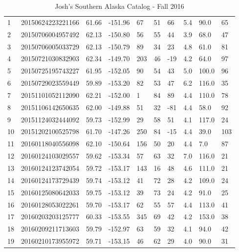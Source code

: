 \documentclass[11pt,titlepage,fleqn]{article}
\begin{document}
\clearpage\pagebreak
\begin{table}[]
\centering
\caption{Josh's Southern Alaska Catalog - Fall 2016}

\label{my-label}
\begin{tabular}{llllllllll}
\hline
1 & 20150624223221166 & 61.66 & -151.96 &  67 &  51 &  66 & 5.4 & 90.0 & 65 \\ 
2 & 20150706004957492 & 62.13 & -150.80 &  56 &  55 &  44 & 3.9 & 68.0 & 47 \\ 
3 & 20150706005033729 & 62.13 & -150.79 &  89 &  34 &  23 & 4.8 & 61.0 & 81 \\ 
4 & 20150721030832903 & 62.34 & -149.70 & 203 &  46 & -19 & 4.2 & 64.0 & 97 \\ 
5 & 20150725195743227 & 61.95 & -152.05 &  90 &  54 &  43 & 5.0 & 100.0 & 96 \\ 
6 & 20150729023559449 & 59.89 & -153.20 &  82 &  53 &  47 & 6.2 & 116.0 & 35 \\ 
7 & 20151101052112090 & 62.21 & -152.00 &   1 &  84 &  89 & 4.4 & 110.0 & 78 \\ 
8 & 20151106142650635 & 62.00 & -149.88 &  51 &  32 & -81 & 4.4 & 58.0 & 92 \\ 
9 & 20151124032444092 & 59.73 & -152.99 &  29 &  58 &  51 & 4.1 & 117.0 & 24 \\ 
10 & 20151202100525798 & 61.70 & -147.26 & 250 &  84 & -15 & 4.4 & 39.0 & 103 \\ 
11 & 20160118040556098 & 62.10 & -150.64 & 156 &  50 &  20 & 4.4 & 7.0 & 87 \\ 
12 & 20160124103029557 & 59.62 & -153.34 &  57 &  63 &  32 & 7.0 & 116.0 & 21 \\ 
13 & 20160124123742054 & 59.72 & -153.17 & 143 &  16 &  48 & 4.6 & 111.0 & 21 \\ 
14 & 20160124173729439 & 59.74 & -153.12 &  41 &  72 &  28 & 4.2 & 109.0 & 24 \\ 
15 & 20160125080642033 & 59.75 & -153.12 &  39 &  73 &  24 & 4.2 & 91.0 & 25 \\ 
16 & 20160128053022261 & 59.70 & -153.17 &  62 &  55 &  57 & 4.4 & 113.0 & 41 \\ 
17 & 20160203203125777 & 60.33 & -153.55 & 345 &  69 &  42 & 4.2 & 153.0 & 38 \\ 
18 & 20160209211713603 & 59.79 & -152.97 &  63 &  59 &  32 & 4.1 & 94.0 & 42 \\ 
19 & 20160210173955972 & 59.71 & -153.15 &  46 &  62 &  29 & 4.0 & 90.0 & 31 \\ 

\end{tabular}
\end{table}
\end{document}

